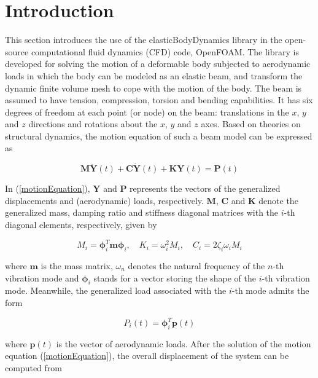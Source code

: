 \label{sec:EBD-theory}

\section{Introduction}

This section introduces the use of the elasticBodyDynamics library in the open-source computational fluid dynamics (CFD) code, OpenFOAM. The library is developed for solving the motion of a deformable body subjected to aerodynamic loads in which the body can be modeled as an elastic beam, and transform the dynamic finite volume mesh to cope with the motion of the body. The beam is assumed to have tension, compression, torsion and bending capabilities. It has six degrees of freedom at each point (or node) on the beam: translations in the $x$, $y$ and $z$ directions and rotations about the $x$, $y$ and $z$ axes. Based on theories on structural dynamics, the motion equation of such a beam model can be expressed as 

\begin{equation} \label{motionEquation}
\boldsymbol{M}\ddot{\boldsymbol{Y}}(t)+\boldsymbol{C}\dot{\boldsymbol{Y}}(t)+\boldsymbol{K}\boldsymbol{Y}(t) = \boldsymbol{P}(t)
\end{equation}

\noindent In (\ref{motionEquation}), $\boldsymbol{Y}$ and $\boldsymbol{P}$ represents the vectors of the generalized displacements and (aerodynamic) loads, respectively. $\boldsymbol{M}$, $\boldsymbol{C}$ and $\boldsymbol{K}$ denote the generalized mass, damping ratio and stiffness diagonal matrices with the $i$-th diagonal elements, respectively, given by

\begin{equation}
M_i = \boldsymbol{\phi}_i^T\boldsymbol{m}\boldsymbol{\phi}_i, \quad
K_i = \omega_i^2M_i, \quad
C_i = 2\zeta_i\omega_iM_i
\end{equation}

\noindent where $\boldsymbol{m}$ is the mass matrix, $\omega_n$ denotes the natural frequency of the $n$-th vibration mode and $\boldsymbol{\phi}_i$ stands for a vector storing the shape of the $i$-th vibration mode. Meanwhile, the generalized load associated with the $i$-th mode admits the form

\begin{equation}
P_i(t) = \boldsymbol{\phi}_i^T\boldsymbol{p}(t)
\end{equation}

\noindent where $\boldsymbol{p}(t)$ is the vector of aerodynamic loads. After the solution of the motion equation (\ref{motionEquation}), the overall displacement of the system can be computed from

